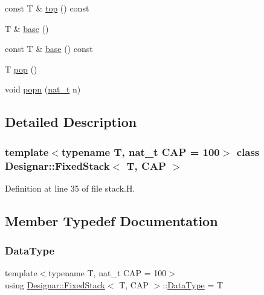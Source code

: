 \begin{DoxyCompactItemize}
\item 
const T \& \hyperlink{class_designar_1_1_fixed_stack_a02582f09d4935d315b28da7ae93db0b3}{top} () const
\item 
T \& \hyperlink{class_designar_1_1_fixed_stack_a01f5207d31f8bbad380ea6923a0bbb80}{base} ()
\item 
const T \& \hyperlink{class_designar_1_1_fixed_stack_a27e6b0668b52af53a224a0e8fcd4b719}{base} () const
\item 
T \hyperlink{class_designar_1_1_fixed_stack_aec21fd8a87337b86e866370b9ed48d1c}{pop} ()
\item 
void \hyperlink{class_designar_1_1_fixed_stack_a9df4fb5afc82545ef1a27eb71bdd84cd}{popn} (\hyperlink{namespace_designar_aa72662848b9f4815e7bf31a7cf3e33d1}{nat\+\_\+t} n)
\end{DoxyCompactItemize}


\subsection{Detailed Description}
\subsubsection*{template$<$typename T, nat\+\_\+t C\+AP = 100$>$\newline
class Designar\+::\+Fixed\+Stack$<$ T, C\+A\+P $>$}



Definition at line 35 of file stack.\+H.



\subsection{Member Typedef Documentation}
\mbox{\label{class_designar_1_1_fixed_stack_a4f0d06b958131d97f8084e7961d51577}} 
\subsubsection{\texorpdfstring{Data\+Type}{DataType}}
{\footnotesize\ttfamily template$<$typename T, nat\+\_\+t C\+AP = 100$>$ \\
using \hyperlink{class_designar_1_1_fixed_stack}{Designar\+::\+Fixed\+Stack}$<$ T, C\+AP $>$\+::\hyperlink{class_designar_1_1_fixed_stack_a4f0d06b958131d97f8084e7961d51577}{Data\+Type} =  T}



